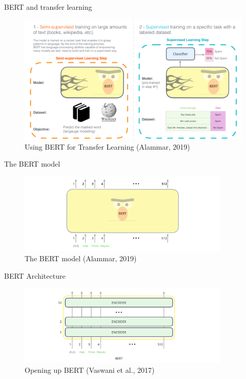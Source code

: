 \documentclass[10pt]{beamer}
\begin{document}
\begin{frame}{BERT and transfer learning}

\begin{figure}[h]
\centering
\includegraphics[width=1\textwidth]{fig/bert-transfer-learning.png}
\caption{Using BERT for Transfer Learning (Alammar, 2019)}
\end{figure}

\end{frame}


\begin{frame}{The BERT model}

\begin{figure}[h]
\centering
\includegraphics[width=0.9\textwidth]{fig/bert-input-output.png}
\caption{The BERT model (Alammar, 2019)}
\end{figure}

\end{frame}


\begin{frame}{BERT Architecture}

\begin{figure}[h]
\centering
\includegraphics[width=0.9\textwidth]{fig/bert-encoders-input.png}
\caption{Opening up BERT (Vaswani et al., 2017)}
\end{figure}

\end{frame}
\end{document}
